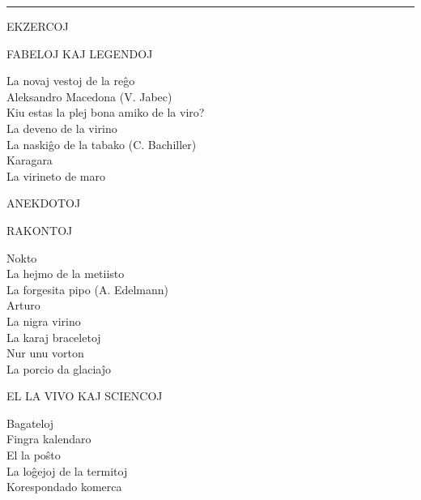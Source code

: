 \begin{center}
\thispagestyle{plain}
\end{center}

{ %

\small

\setlength{\parindent}{0pt}
\setlength{\parskip}{1em}

{\centering \rule{13mm}{0.4pt}\par}

{\sansfont EKZERCOJ} \Dotfill \pageref{ekzercoj}

{\centering \sansfont FABELOJ KAJ LEGENDOJ\par}

La novaj vestoj de la reĝo \Dotfill \pageref{novajvestoj} \\
Aleksandro Macedona (V. Jabec) \Dotfill \pageref{aleksandro} \\
Kiu estas la plej bona amiko de la viro? \Dotfill \pageref{plejbona} \\
La deveno de la virino \Dotfill \pageref{deveno} \\
La naskiĝo de la tabako (C. Bachiller) \Dotfill \pageref{tabako}\\
Karagara \Dotfill \pageref{karagara} \\
La virineto de maro \Dotfill \pageref{virineto}

{\sansfont ANEKDOTOJ} \Dotfill \pageref{anekdotoj}

{\centering \sansfont RAKONTOJ\par}

Nokto \Dotfill \pageref{nokto} \\
La hejmo de la metiisto \Dotfill \pageref{metiisto}\\
La forgesita pipo (A. Edelmann) \Dotfill \pageref{pipo}\\
Arturo \Dotfill \pageref{arturo}\\
La nigra virino \Dotfill \pageref{nigra}\\
La karaj braceletoj \Dotfill \pageref{braceletoj}\\
Nur unu vorton \Dotfill \pageref{unuvorton}\\
La porcio da glaciaĵo \Dotfill \pageref{porcio}

{\centering \sansfont EL LA VIVO KAJ SCIENCOJ\par}

Bagateloj \Dotfill \pageref{bagateloj} \\
Fingra kalendaro \Dotfill \pageref{fingra} \\
El la poŝto \Dotfill \pageref{posxto} \\
La loĝejoj de la termitoj \Dotfill \pageref{termitoj} \\
Korespondado komerca \Dotfill \pageref{komerca} 

}
